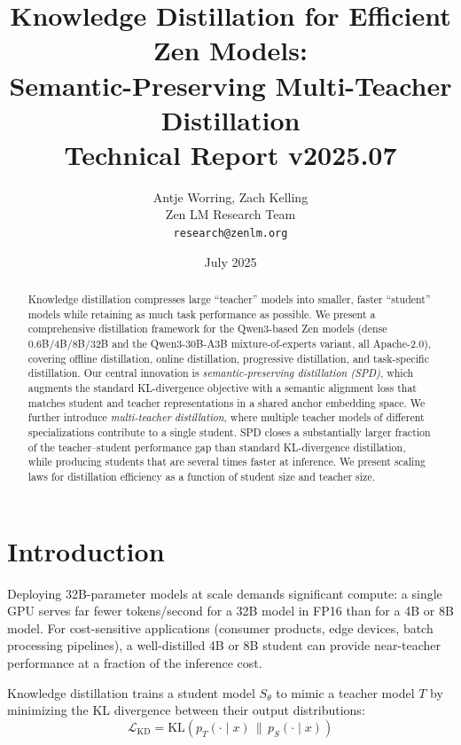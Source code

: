 \documentclass[11pt,a4paper]{article}
\title{\textbf{Knowledge Distillation for Efficient Zen Models:\\
Semantic-Preserving Multi-Teacher Distillation}\\
\large Technical Report v2025.07}
\author{Antje Worring, Zach Kelling \\ Zen LM Research Team\\
\texttt{research@zenlm.org}}
\date{July 2025}
\begin{document}
\maketitle

\begin{abstract}
Knowledge distillation compresses large ``teacher'' models into smaller, faster
``student'' models while retaining as much task performance as possible. We present
a comprehensive distillation framework for the Qwen3-based Zen models (dense
0.6B/4B/8B/32B and the Qwen3-30B-A3B mixture-of-experts variant, all Apache-2.0),
covering offline distillation, online distillation, progressive distillation, and
task-specific distillation. Our central innovation is \emph{semantic-preserving
distillation (SPD)}, which augments the standard KL-divergence objective with a semantic
alignment loss that matches student and teacher representations in a shared anchor
embedding space. We further introduce \emph{multi-teacher distillation}, where multiple
teacher models of different specializations contribute to a single student. SPD closes a
substantially larger fraction of the teacher--student performance gap than standard
KL-divergence distillation, while producing students that are several times faster at
inference. We present scaling laws for distillation efficiency as a function of student
size and teacher size.
\end{abstract}

\tableofcontents
\newpage

\section{Introduction}
\label{sec:intro}

Deploying 32B-parameter models at scale demands significant compute: a single GPU serves
far fewer tokens/second for a 32B model in FP16 than for a 4B or 8B model. For
cost-sensitive applications (consumer products, edge devices, batch processing
pipelines), a well-distilled 4B or 8B student can provide near-teacher performance at a
fraction of the inference cost.

Knowledge distillation \cite{hinton2015distilling} trains a student model $S_\theta$
to mimic a teacher model $T$ by minimizing the KL divergence between their output
distributions:
\begin{equation}
    \mathcal{L}_{\text{KD}} = \text{KL}(p_T(\cdot \mid x) \,\|\, p_S(\cdot \mid x))
    \label{eq:kd}
\end{equation}
\end{document}

